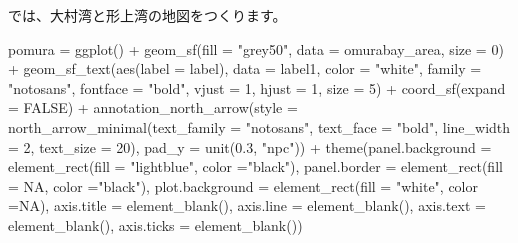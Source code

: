 \documentclass[
]{book}
\newenvironment{Shaded}{\begin{snugshade}}{\end{snugshade}}
\newcommand{\AttributeTok}[1]{\textcolor[rgb]{0.77,0.63,0.00}{#1}}
\newcommand{\ConstantTok}[1]{\textcolor[rgb]{0.00,0.00,0.00}{#1}}
\newcommand{\DecValTok}[1]{\textcolor[rgb]{0.00,0.00,0.81}{#1}}
\newcommand{\FloatTok}[1]{\textcolor[rgb]{0.00,0.00,0.81}{#1}}
\newcommand{\FunctionTok}[1]{\textcolor[rgb]{0.00,0.00,0.00}{#1}}
\newcommand{\NormalTok}[1]{#1}
\newcommand{\OtherTok}[1]{\textcolor[rgb]{0.56,0.35,0.01}{#1}}
\newcommand{\SpecialCharTok}[1]{\textcolor[rgb]{0.00,0.00,0.00}{#1}}
\newcommand{\StringTok}[1]{\textcolor[rgb]{0.31,0.60,0.02}{#1}}
\theoremstyle{definition}
\theoremstyle{definition}
\theoremstyle{definition}
\theoremstyle{definition}
\theoremstyle{remark}
\begin{document}
では、大村湾と形上湾の地図をつくります。

\begin{Shaded}
\begin{Highlighting}[]
\NormalTok{pomura }\OtherTok{=} \FunctionTok{ggplot}\NormalTok{() }\SpecialCharTok{+}
  \FunctionTok{geom\_sf}\NormalTok{(}\AttributeTok{fill =} \StringTok{"grey50"}\NormalTok{, }\AttributeTok{data =}\NormalTok{ omurabay\_area, }\AttributeTok{size =} \DecValTok{0}\NormalTok{) }\SpecialCharTok{+}
  \FunctionTok{geom\_sf\_text}\NormalTok{(}\FunctionTok{aes}\NormalTok{(}\AttributeTok{label =}\NormalTok{ label), }
               \AttributeTok{data =}\NormalTok{ label1,}
               \AttributeTok{color =} \StringTok{"white"}\NormalTok{,}
               \AttributeTok{family =} \StringTok{"notosans"}\NormalTok{, }
               \AttributeTok{fontface =} \StringTok{"bold"}\NormalTok{,}
               \AttributeTok{vjust =} \DecValTok{1}\NormalTok{, }\AttributeTok{hjust =} \DecValTok{1}\NormalTok{,}
               \AttributeTok{size =} \DecValTok{5}\NormalTok{)  }\SpecialCharTok{+} 
  \FunctionTok{coord\_sf}\NormalTok{(}\AttributeTok{expand =} \ConstantTok{FALSE}\NormalTok{) }\SpecialCharTok{+}
  \FunctionTok{annotation\_north\_arrow}\NormalTok{(}\AttributeTok{style =} \FunctionTok{north\_arrow\_minimal}\NormalTok{(}\AttributeTok{text\_family =} \StringTok{"notosans"}\NormalTok{, }
                                                     \AttributeTok{text\_face =} \StringTok{"bold"}\NormalTok{,}
                                                     \AttributeTok{line\_width =} \DecValTok{2}\NormalTok{,}
                                                     \AttributeTok{text\_size =} \DecValTok{20}\NormalTok{),}
                         \AttributeTok{pad\_y =} \FunctionTok{unit}\NormalTok{(}\FloatTok{0.3}\NormalTok{, }\StringTok{"npc"}\NormalTok{)) }\SpecialCharTok{+} 
  \FunctionTok{theme}\NormalTok{(}\AttributeTok{panel.background =} \FunctionTok{element\_rect}\NormalTok{(}\AttributeTok{fill =} \StringTok{"lightblue"}\NormalTok{, }\AttributeTok{color =}\StringTok{"black"}\NormalTok{),}
        \AttributeTok{panel.border  =} \FunctionTok{element\_rect}\NormalTok{(}\AttributeTok{fill =} \ConstantTok{NA}\NormalTok{, }\AttributeTok{color =}\StringTok{"black"}\NormalTok{),}
        \AttributeTok{plot.background =}  \FunctionTok{element\_rect}\NormalTok{(}\AttributeTok{fill =} \StringTok{"white"}\NormalTok{, }\AttributeTok{color =}\ConstantTok{NA}\NormalTok{),}
        \AttributeTok{axis.title =} \FunctionTok{element\_blank}\NormalTok{(),}
        \AttributeTok{axis.line =} \FunctionTok{element\_blank}\NormalTok{(),}
        \AttributeTok{axis.text =} \FunctionTok{element\_blank}\NormalTok{(),}
        \AttributeTok{axis.ticks =} \FunctionTok{element\_blank}\NormalTok{())}


\end{Highlighting}
\end{Shaded}
\end{document}
